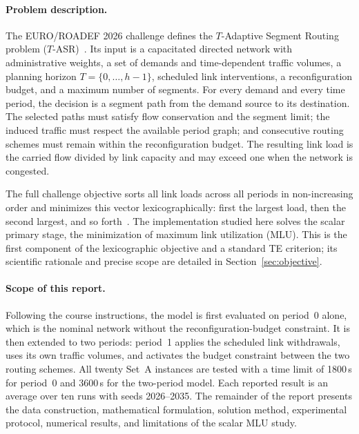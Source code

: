 \paragraph{Problem description.}
The EURO/ROADEF 2026 challenge defines the $T$-Adaptive Segment Routing problem
($T$-ASR)~\citep{orange2026}. Its input is a capacitated directed network with administrative
weights, a set of demands and time-dependent traffic volumes, a planning horizon
$T=\{0,\ldots,h-1\}$, scheduled link interventions, a reconfiguration budget, and a maximum number of
segments. For every demand and every time period, the decision is a segment path from the demand
source to its destination. The selected paths must satisfy flow conservation and the segment limit;
the induced traffic must respect the available period graph; and consecutive routing schemes must
remain within the reconfiguration budget. The resulting link load is the carried flow divided by link
capacity and may exceed one when the network is congested.

The full challenge objective sorts all link loads across all periods in non-increasing order and
minimizes this vector lexicographically: first the largest load, then the second largest, and so
forth~\citep{orange2026}. The implementation studied here solves the scalar primary stage, the
minimization of maximum link utilization (MLU). This is the first component of the lexicographic
objective and a standard TE criterion; its scientific rationale and precise scope are detailed in
Section~\ref{sec:objective}.

\paragraph{Scope of this report.}
Following the course instructions, the model is first evaluated on period~0 alone, which is the
nominal network without the reconfiguration-budget constraint. It is then extended to two periods:
period~1 applies the scheduled link withdrawals, uses its own traffic volumes, and activates the
budget constraint between the two routing schemes. All twenty Set~A instances are tested with a time
limit of 1800\,s for period~0 and 3600\,s for the two-period model. Each reported result is an average
over ten runs with seeds 2026--2035. The remainder of the report presents the data construction,
mathematical formulation, solution method, experimental protocol, numerical results, and limitations
of the scalar MLU study.
